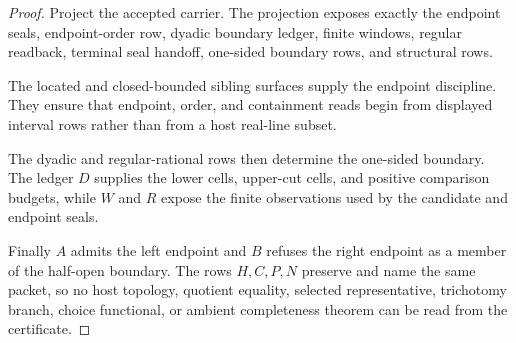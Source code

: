 \begin{proof}
Project the accepted carrier. The projection exposes exactly the endpoint seals, endpoint-order row, dyadic boundary ledger, finite windows, regular readback, terminal seal handoff, one-sided boundary rows, and structural rows.

The located and closed-bounded sibling surfaces supply the endpoint discipline. They ensure that endpoint, order, and containment reads begin from displayed interval rows rather than from a host real-line subset.

The dyadic and regular-rational rows then determine the one-sided boundary. The ledger $D$ supplies the lower cells, upper-cut cells, and positive comparison budgets, while $W$ and $R$ expose the finite observations used by the candidate and endpoint seals.

Finally $A$ admits the left endpoint and $B$ refuses the right endpoint as a member of the half-open boundary. The rows $H,C,P,N$ preserve and name the same packet, so no host topology, quotient equality, selected representative, trichotomy branch, choice functional, or ambient completeness theorem can be read from the certificate.
\end{proof}

